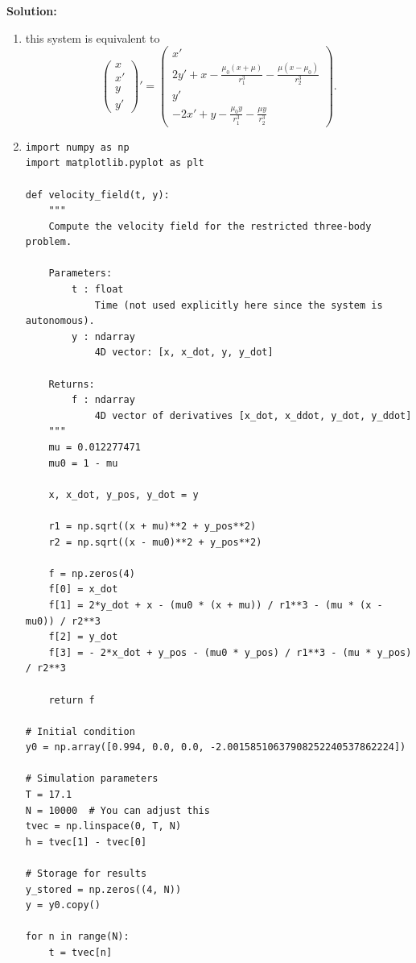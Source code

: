 \documentclass[a4paper,12pt]{scrartcl} %
\newenvironment{solution}
  {\par\color{answercolor}\textbf{Solution:}\ }
  {\par}
\theoremstyle{darktheorem}
\begin{document}
\begin{solution}
    \begin{enumerate}
        \item
            this system is equivalent to 
            \[
            \begin{pmatrix} x \\ x' \\ y \\ y' \end{pmatrix}' = \begin{pmatrix} x' \\ 2y' + x - \frac{\mu_0(x+\mu)}{r_1^{3}} - \frac{\mu(x-\mu_0)}{r_2^{3}} \\ y' \\ -2x' + y - \frac{\mu_0y}{r_1^{3}} - \frac{\mu y}{r_2^{3}} \end{pmatrix} 
            .\] 
        \item 
            \begin{lstlisting}
import numpy as np
import matplotlib.pyplot as plt

def velocity_field(t, y):
    """
    Compute the velocity field for the restricted three-body problem.

    Parameters:
        t : float
            Time (not used explicitly here since the system is autonomous).
        y : ndarray
            4D vector: [x, x_dot, y, y_dot]

    Returns:
        f : ndarray
            4D vector of derivatives [x_dot, x_ddot, y_dot, y_ddot]
    """
    mu = 0.012277471
    mu0 = 1 - mu

    x, x_dot, y_pos, y_dot = y

    r1 = np.sqrt((x + mu)**2 + y_pos**2)
    r2 = np.sqrt((x - mu0)**2 + y_pos**2)

    f = np.zeros(4)
    f[0] = x_dot
    f[1] = 2*y_dot + x - (mu0 * (x + mu)) / r1**3 - (mu * (x - mu0)) / r2**3
    f[2] = y_dot
    f[3] = - 2*x_dot + y_pos - (mu0 * y_pos) / r1**3 - (mu * y_pos) / r2**3

    return f

# Initial condition
y0 = np.array([0.994, 0.0, 0.0, -2.00158510637908252240537862224])

# Simulation parameters
T = 17.1
N = 10000  # You can adjust this
tvec = np.linspace(0, T, N)
h = tvec[1] - tvec[0]

# Storage for results
y_stored = np.zeros((4, N))
y = y0.copy()

for n in range(N):
    t = tvec[n]


\end{lstlisting}
\end{enumerate}
\end{solution}
\end{document}
